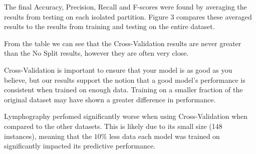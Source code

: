 \documentclass[11pt]{article}
\begin{document}
    The final Accuracy, Precision, Recall and F-scores were found by averaging the results from testing on each isolated partition. Figure 3 compares these averaged results to the results from training and testing on the entire dataset.

    From the table we can see that the Cross-Validation results are never greater than the No Split results, however they are often very close.

    Cross-Validation is important to ensure that your model is as good as you believe, but our results support the notion that a good model's performance is consistent when trained on enough data. Training on a smaller fraction of the original dataset may have shown a greater difference in performance.

    Lymphography perfomed significantly worse when using Cross-Validation when compared to the other datasets. This is likely due to its small size (148 instances), meaning that the $10\%$ less data each model was trained on significantly impacted its predictive performance.
\end{document}
